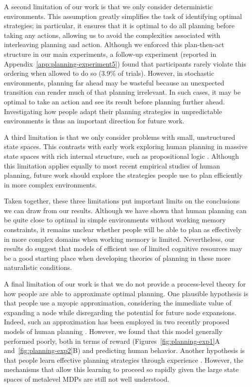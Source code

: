 A second limitation of our work is that we only consider deterministic environments. This assumption greatly simplifies the task of identifying optimal strategies; in particular, it ensures that it is optimal to do all planning before taking any actions, allowing us to avoid the complexities associated with interleaving planning and action. Although we enforced this plan-then-act structure in our main experiments, a follow-up experiment (reported in Appendix~\ref{app:planning-experiment5}) found that participants rarely violate this ordering when allowed to do so (3.9\% of trials). However, in stochastic environments, planning far ahead may be wasteful because an unexpected transition can render much of that planning irrelevant. In such cases, it may be optimal to take an action and see its result before planning further ahead. Investigating how people adapt their planning strategies in unpredictable environments is thus an important direction for future work.

A third limitation is that we only consider problems with small, unstructured state spaces. This contrasts with early work exploring human planning in massive state spaces with rich internal structure, such as propositional logic \citep{newell1972human}. Although this limitation applies equally to most recent empirical studies of human planning, future work should explore the strategies people use to plan efficiently in more complex environments.

Taken together, these three limitations put important limits on the conclusions we can draw from our results. Although we have shown that human planning can be quite close to optimal in simple environments without working memory constraints, it remains unclear whether people will be able to plan as effectively in more complex domains when working memory is limited. Nevertheless, our results do suggest that models of efficient use of limited cognitive resources may be a good starting place when developing theories of planning in these more naturalistic conditions.

A final limitation of our work is that we do not provide a process-level theory for how people are able to approximate optimal planning. One plausible hypothesis is that people use a myopic approximation, considering the immediate value of expanding a node while disregarding the potential for future node expansions. Indeed, such an approximation has been employed in two recently proposed models of human planning \citep{mattar2018prioritized,sezener2019optimizing}. However, we found that this model generally performed poorly, both in terms of reward (Figures~\ref{fig:planning-exp1}A and~\ref{fig:planning-exp2}B) and predicting human behavior. Another hypothesis is that people learn effective planning strategies through experience \citep{lieder2017strategy,krueger2017enhancing}. However, the mechanisms that allow this learning to proceed so rapidly given the large state spaces of metalevel MDPs are still not well understood.

